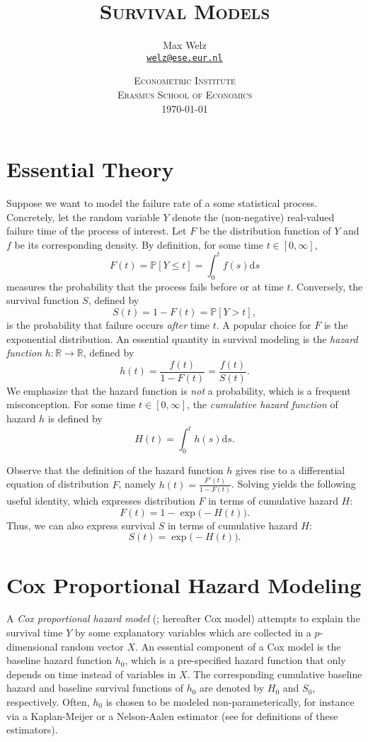 \documentclass[11pt]{article}
\title{\textsc{Survival Models}}
\author{Max Welz \\
  \href{mailto:welz@ese.eur.nl}{\texttt{welz@ese.eur.nl}}}
\date{%
    \textsc{Econometric Institute\\ Erasmus School of Economics}\\[2ex]%
    \today}
\renewcommand{\P}{\mathbb{P}}
\newcommand{\R}{\mathbb{R}}
\renewcommand{\d}{\text{d}}
\begin{document}
\maketitle

\section{Essential Theory}
Suppose we want to model the failure rate of a some statistical process. Concretely, let the random variable $Y$ denote the (non-negative) real-valued failure time of the process of interest. Let $F$ be the distribution function of $Y$ and $f$ be its corresponding density. By definition, for some time $t\in[0, \infty]$,
\[
    F(t) = \P[Y \leq t]
    =
    \int_0^t f(s)\d s
\]
measures the probability that the process fails before or at time $t$. Conversely, the survival function $S$, defined by
\[
    S(t) = 1 - F(t) = \P[Y > t],
\]
is the probability that failure occurs \textit{after} time $t$. A popular choice for $F$ is the exponential distribution. An essential quantity in survival modeling is the \textit{hazard function} $h:\R\to\R$, defined by
\[
    h(t) = \frac{f(t)}{1-F(t)} = \frac{f(t)}{S(t)}.
\]
We emphasize that the hazard function is \textit{not} a probability, which is a frequent misconception. For some time $t\in[0, \infty]$, the \textit{cumulative hazard function} of hazard $h$ is defined by
\[
    H(t) = \int_0^t h(s) \d s.
\]

Observe that the definition of the hazard function $h$ gives rise to a differential equation of distribution $F$, namely $h(t) = \frac{F'(t)}{1-F(t)}$. Solving yields the following useful identity, which expresses distribution $F$ in terms of cumulative hazard $H$:
\[
    F(t) = 1 - \exp\big( - H(t) \big). 
\]
Thus, we can also express survival $S$ in terms of  cumulative hazard $H$:
\[
    S(t) = \exp \big( - H(t) \big).
\]

\section{Cox Proportional Hazard Modeling}
A \textit{Cox proportional hazard model} (\cite{cox1972}; hereafter Cox model) attempts to explain the survival time $Y$ by some explanatory variables which are collected in a $p$-dimensional random vector $X$. An essential component of a Cox model is the baseline hazard function $h_0$, which is a pre-specified hazard function that only depends on time instead of variables in $X$. The corresponding cumulative baseline hazard and baseline survival functions of $h_0$ are denoted by $H_0$ and $S_0$, respectively. Often, $h_0$ is chosen to be modeled non-parameterically, for instance via a Kaplan-Meijer or a Nelson-Aalen estimator (see \cite{cameron2005} for definitions of these estimators).
\end{document}
